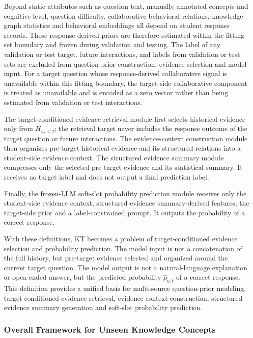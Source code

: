 \documentclass[a4paper,12pt]{article}
\numberwithin{table}{section}
\begin{document}
Beyond static attributes such as question text, manually annotated concepts and cognitive level, question difficulty, collaborative behavioral relations, knowledge-graph statistics and behavioral embeddings all depend on student response records. These response-derived priors are therefore estimated within the fitting-set boundary and frozen during validation and testing. The label of any validation or test target, future interactions, and labels from validation or test sets are excluded from question-prior construction, evidence selection and model input. For a target question whose response-derived collaborative signal is unavailable within this fitting boundary, the target-side collaborative component is treated as unavailable and is encoded as a zero vector rather than being estimated from validation or test interactions.

The target-conditioned evidence retrieval module first selects historical evidence only from \(H_{u,<t}\); the retrieval target never includes the response outcome of the target question or future interactions. The evidence-context construction module then organizes pre-target historical evidence and its structured relations into a student-side evidence context. The structured evidence summary module compresses only the selected pre-target evidence and its statistical summary. It receives no target label and does not output a final prediction label.

Finally, the frozen-LLM soft-slot probability prediction module receives only the student-side evidence context, structured evidence summary-derived features, the target-side prior and a label-constrained prompt. It outputs the probability of a correct response.

With these definitions, KT becomes a problem of target-conditioned evidence selection and probability prediction. The model input is not a concatenation of the full history, but pre-target evidence selected and organized around the current target question. The model output is not a natural-language explanation or open-ended answer, but the predicted probability \(\hat{p}_{u,t}\) of a correct response. This definition provides a unified basis for multi-source question-prior modeling, target-conditioned evidence retrieval, evidence-context construction, structured evidence summary generation and soft-slot probability prediction.

\subsubsection{Overall Framework for Unseen Knowledge Concepts}
\end{document}
